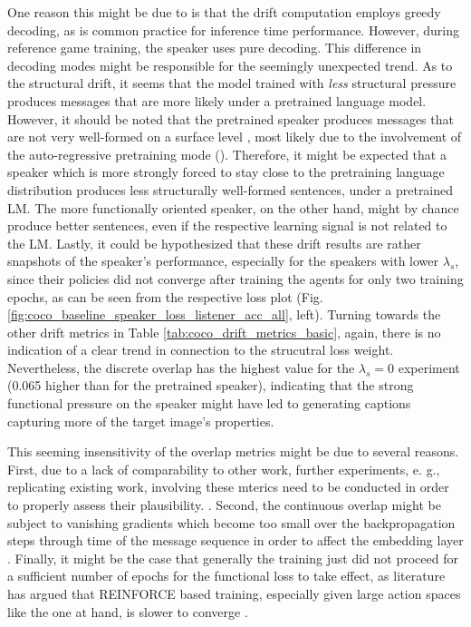 One reason this might be due to is that the drift computation employs greedy decoding, as is common practice for inference time performance. However, during reference game training, the speaker uses pure decoding. This difference in decoding modes might be responsible for the seemingly unexpected trend. As to the structural drift, it seems that the model trained with \emph{less} structural pressure produces messages that are more likely under a pretrained language model. However, it should be noted that the pretrained speaker produces messages that are not very well-formed on a surface level , most likely due to the involvement of the auto-regressive pretraining mode (). Therefore, it might be expected that a speaker which is more strongly forced to stay close to the pretraining language distribution produces less structurally well-formed sentences, under a pretrained LM. The more functionally oriented speaker, on the other hand, might by chance produce better sentences, even if the respective learning signal is not related to the LM. Lastly, it could be hypothesized that these drift results are rather snapshots of the speaker's performance, especially for the speakers with lower $\lambda_s$, since their policies did not converge after training the agents for only two training epochs, as can be seen from the respective loss plot (Fig. \ref{fig:coco_baseline_speaker_loss_listener_acc_all}, left). 
Turning towards the other drift metrics in Table \ref{tab:coco_drift_metrics_basic}, again, there is no indication of a clear trend in connection to the strucutral loss weight. Nevertheless, the discrete overlap has the highest value for the $\lambda_s = 0$ experiment (0.065 higher than for the pretrained speaker), indicating that the strong functional pressure on the speaker might have led to generating captions capturing more of the target image's properties.

This seeming insensitivity of the overlap metrics might be due to several reasons. First, due to a lack of comparability to other work, further experiments, e. g., replicating existing work, involving these mterics need to be conducted in order to properly assess their plausibility. . Second, the continuous overlap might be subject to vanishing gradients which become too small over the backpropagation steps through time of the message sequence in order to affect the embedding layer \parencite[cf.][]{jaeger2002tutorial}. Finally, it might be the case that generally the training just did not proceed for a sufficient number of epochs for the functional loss to take effect, as literature has argued that REINFORCE based training, especially given large action spaces like the one at hand, is slower to converge \parencite{havrylov2017emergence} .

